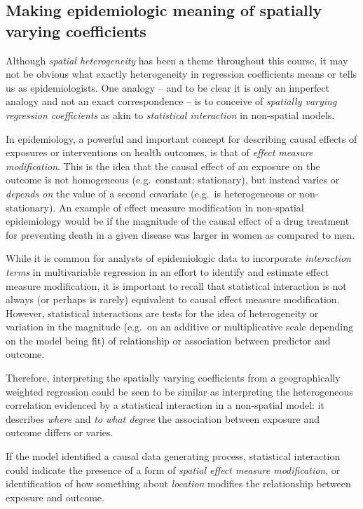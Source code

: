 \documentclass[
]{book}
\begin{document}
\hypertarget{making-epidemiologic-meaning-of-spatially-varying-coefficients}{%
\subsection{Making epidemiologic meaning of spatially varying coefficients}\label{making-epidemiologic-meaning-of-spatially-varying-coefficients}}

Although \emph{spatial heterogeneity} has been a theme throughout this course, it may not be obvious what exactly heterogeneity in regression coefficients means or tells us as epidemiologists. One analogy -- and to be clear it is only an imperfect analogy and not an exact correspondence -- is to conceive of \emph{spatially varying regression coefficients} as akin to \emph{statistical interaction} in non-spatial models.

In epidemiology, a powerful and important concept for describing causal effects of exposures or interventions on health outcomes, is that of \emph{effect measure modification}. This is the idea that the causal effect of an exposure on the outcome is not homogeneous (e.g.~constant; stationary), but instead varies or \emph{depends on} the value of a second covariate (e.g.~is heterogeneous or non-stationary). An example of effect measure modification in non-spatial epidemiology would be if the magnitude of the causal effect of a drug treatment for preventing death in a given disease was larger in women as compared to men.

While it is common for analysts of epidemiologic data to incorporate \emph{interaction terms} in multivariable regression in an effort to identify and estimate effect measure modification, it is important to recall that statistical interaction is not always (or perhaps is rarely) equivalent to causal effect measure modification. However, statistical interactions are tests for the idea of heterogeneity or variation in the magnitude (e.g.~on an additive or multiplicative scale depending on the model being fit) of relationship or association between predictor and outcome.

Therefore, interpreting the spatially varying coefficients from a geographically weighted regression could be seen to be similar as interpreting the heterogeneous correlation evidenced by a statistical interaction in a non-spatial model: it describes \emph{where} and \emph{to what degree} the association between exposure and outcome differs or varies.

If the model identified a causal data generating process, statistical interaction could indicate the presence of a form of \emph{spatial effect measure modification}, or identification of how something about \emph{location} modifies the relationship between exposure and outcome.
\end{document}
